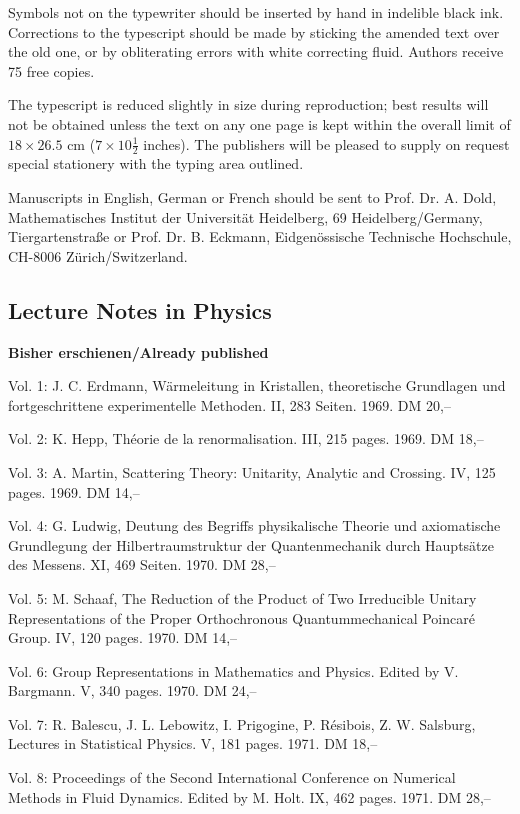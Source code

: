Symbols not on the typewriter should be inserted by hand in indelible black ink.
Corrections to the typescript should be made by sticking the amended text over
the old one, or by obliterating errors with white correcting fluid. Authors
receive 75 free copies.

The typescript is reduced slightly in size during reproduction; best results
will not be obtained unless the text on any one page is kept within the overall
limit of $18\times26.5$ cm ($7\times10\frac12$ inches). The publishers will be
pleased to supply on request special stationery with the typing area outlined.

Manuscripts in English, German or French should be sent to Prof. Dr. A. Dold,
Mathematisches Institut der Universität Heidelberg, 69 Heidelberg/Germany,
Tiergartenstraße or Prof. Dr. B. Eckmann, Eidgenössische Technische Hochschule,
CH-8006 Zürich/Switzerland.

\subsection*{Lecture Notes in Physics}
\textbf{Bisher erschienen/Already published}

Vol. 1: J. C. Erdmann, Wärmeleitung in Kristallen, theoretische Grundlagen und
fortgeschrittene experimentelle Methoden. II, 283 Seiten. 1969. DM 20,--

Vol. 2: K. Hepp, Théorie de la renormalisation. III, 215 pages. 1969. DM 18,--

Vol. 3: A. Martin, Scattering Theory: Unitarity, Analytic and Crossing.
IV, 125 pages. 1969. DM 14,--

Vol. 4: G. Ludwig, Deutung des Begriffs physikalische Theorie und axiomatische
Grundlegung der Hilbertraumstruktur der Quantenmechanik durch Hauptsätze des
Messens. XI, 469 Seiten. 1970. DM 28,--

Vol. 5: M. Schaaf, The Reduction of the Product of Two Irreducible Unitary
Representations of the Proper Orthochronous Quantummechanical Poincaré Group.
IV, 120 pages. 1970. DM 14,--

Vol. 6: Group Representations in Mathematics and Physics. Edited by V. Bargmann.
V, 340 pages. 1970. DM 24,--

Vol. 7: R. Balescu, J. L. Lebowitz, I. Prigogine, P. Résibois, Z. W. Salsburg,
Lectures in Statistical Physics. V, 181 pages. 1971. DM 18,--

Vol. 8: Proceedings of the Second International Conference on Numerical Methods
in Fluid Dynamics. Edited by M. Holt. IX, 462 pages. 1971. DM 28,--


